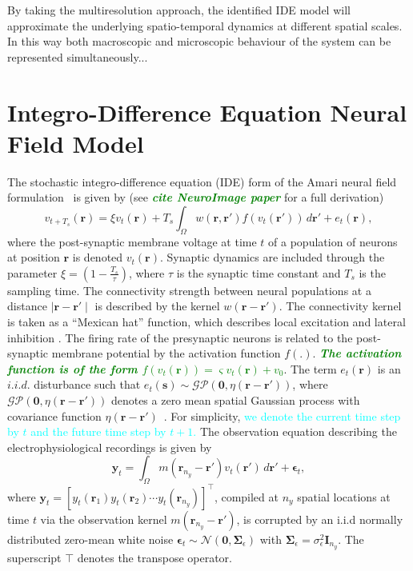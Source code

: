 \documentclass[journal,a4paper]{IEEEtran}
\newcommand{\dean}[1]{\textsf{\emph{\textbf{\textcolor{green}{#1}}}}}
\newcommand{\cut}[1]{\textcolor{cyan}{#1}}
\begin{document}
By taking the multiresolution approach, the identified IDE model will approximate the underlying spatio-temporal dynamics at different spatial scales. In this way both macroscopic and microscopic behaviour of the system can be represented simultaneously...

\section{Integro-Difference Equation Neural Field Model}
The stochastic integro-difference equation (IDE) form of the Amari neural field  formulation~\cite{Amari1977} is given by (see \dean{cite NeuroImage paper} for a full derivation)
\begin{equation}\label{eq:DiscreteTimeModel}
	v_{t+T_s}\left(\mathbf{r}\right) = 
	\xi v_t\left(\mathbf{r}\right) + 
	T_s \int_\Omega { 
	    w\left(\mathbf{r},\mathbf{r'}\right)
	    f\left(v_t\left(\mathbf{r}'\right)\right) 
	\, d\mathbf{r}'} 
	+ e_t\left(\mathbf{r}\right), 
\end{equation}
where the post-synaptic membrane voltage at time $t$ of a population of neurons at position $\mathbf r$ is denoted $v_t\left(\mathbf r\right)$. Synaptic dynamics are included through the parameter $\xi=\left(1-\frac{ T_s}{\tau}\right)$, where $\tau$ is the synaptic time constant and $T_s$ is the sampling time. The connectivity strength between neural populations at a distance $\mid\mathbf{r}-\mathbf{r'}\mid$ is described by the kernel $w\left(\mathbf{r}-\mathbf{r}'\right)$. The connectivity kernel is taken as a ``Mexican hat'' function, which describes local excitation and lateral inhibition \cite{Amari1977}. The firing rate of the presynaptic neurons is related to the post-synaptic membrane potential by the activation function $f\left(.\right)$. \dean{The activation function is of the form $f(v_t(\mathbf{r})) = \varsigma v_t(\mathbf{r}) + v_0$}. The term $e_t(\mathbf r)$ is an $i.i.d.$ disturbance such that $e_t(\mathbf{s})\sim\mathcal{GP}(\mathbf 0,\eta(\mathbf{r}-\mathbf{r'}))$, where $\mathcal{GP}(\mathbf 0,\eta(\mathbf{r}-\mathbf{r'}))$  denotes a zero mean spatial Gaussian process with covariance function $\eta(\mathbf{r}-\mathbf{r'})$~\cite{Rasmussen2005}. For simplicity, \cut{we denote the current time step by $t$ and the future time step by $t+1$.} The observation equation describing the electrophysiological recordings is given by 
\begin{equation}\label{eq:ObservationEquation}
	\mathbf y_t = \int_{\Omega} { m\left(\mathbf{r}_{n_y}-\mathbf{r}'\right) v_t\left(\mathbf{r}'\right) \, d\mathbf{r}'} + \boldsymbol\epsilon_t, 
\end{equation}
where $\mathbf{y}_{t} = [y_t(\mathbf{r}_1) y_t(\mathbf{r}_2) \cdots y_t(\mathbf{r}_{n_y})]^\top$, compiled at $n_{y}$ spatial locations at time $t$ via the observation kernel $m\left(\mathbf{r}_{n_y}-\mathbf{r}'\right)$, is corrupted by an i.i.d normally distributed zero-mean white noise $\boldsymbol{\epsilon}_{t}\sim \mathcal{N}\left(\mathbf{0},\mathbf{\Sigma}_{\epsilon}\right)$ with $\mathbf{\Sigma}_{\epsilon}=\sigma_{\epsilon}^2\mathbf I_{n_y} $. The superscript $\top$ denotes the transpose operator.
\end{document}
